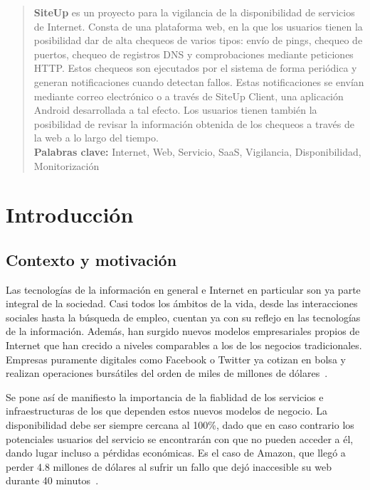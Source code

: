 \documentclass[a4paper,12pt]{article}
\begin{document}
\portada

\vspace{0.25cm}

\begin{abstract}
\textbf{SiteUp} es un proyecto para la vigilancia de la disponibilidad
  de servicios de Internet. Consta de una plataforma web, en la que los usuarios
  tienen la posibilidad dar de alta chequeos de varios tipos: envío de pings,
  chequeo de puertos, chequeo de registros DNS y comprobaciones mediante
  peticiones HTTP. Estos chequeos son ejecutados por el sistema de forma
  periódica y generan notificaciones cuando detectan fallos. Estas
  notificaciones se envían mediante correo electrónico o a través de SiteUp
  Client, una aplicación Android desarrollada a tal efecto. Los usuarios tienen
  también la posibilidad de revisar la información obtenida de los chequeos a
  través de la web a lo largo del tiempo. \\

  \textbf{Palabras clave:} Internet, Web, Servicio, SaaS, Vigilancia,
  Disponibilidad, Monitorización

\end{abstract}







\tableofcontents

\section{Introducción}

\subsection{Contexto y motivación}

Las tecnologías de la información en general e Internet en particular son ya
parte integral de la sociedad. Casi todos los ámbitos de la vida, desde las
interacciones sociales hasta la búsqueda de empleo, cuentan ya con su reflejo en
las tecnologías de la información. Además, han surgido nuevos modelos
empresariales propios de Internet que han crecido a niveles comparables a los de
los negocios tradicionales. Empresas puramente digitales como Facebook o Twitter
ya cotizan en bolsa y realizan operaciones bursátiles del orden de miles de
millones de dólares~\cite{facebook-acquires-whatsapp}.

Se pone así de manifiesto la importancia de la fiablidad de los servicios e
infraestructuras de los que dependen estos nuevos modelos de negocio. La
disponibilidad debe ser siempre cercana al 100\%, dado que en caso contrario los
potenciales usuarios del servicio se encontrarán con que no pueden acceder a él,
dando lugar incluso a pérdidas económicas. Es el caso de Amazon, que llegó a
perder 4.8 millones de dólares al sufrir un fallo que dejó inaccesible su web
durante 40 minutos~\cite{amazon}.
\end{document}

